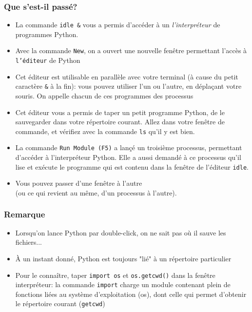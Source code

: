 \documentclass{beamer}
\newcommand{\mypause}{\pause}
\newcommand{\pyth}{{\sc Python}}
\newcommand{\prog}[1]{\alert{\texttt{#1}}}
\begin{document}
\frame
{
\frametitle{Que s'est-il passé?}
{\footnotesize
\begin{itemize}
\item La commande \prog{idle \&} vous a permis d'accéder à un \alert{{\em l'interpréteur}}
de programmes \pyth{}. \mypause{}
\item Avec la commande \prog{New}, on a ouvert une nouvelle fenêtre permettant
l'accès à \prog{l'éditeur} de \pyth{}\mypause{}
\item Cet éditeur est utilisable \alert{en parallèle} avec votre terminal (à cause du petit caractère
\prog{\&} à la fin): vous pouvez utiliser l'un ou l'autre, en déplaçant votre souris. On appelle chacun
de ces programmes des \alert{processus}\mypause{}
\item Cet éditeur vous a permis de taper un petit programme \pyth{}, de le sauvegarder
dans votre répertoire courant. Allez dans votre fenêtre de commande, et vérifiez
avec la commande \prog{ls} qu'il y est bien.\mypause{}
\item La commande \prog{Run Module (F5)} a lançé un troisième processus, permettant
d'accéder à l'interpréteur \pyth{}. Elle a aussi demandé à ce processus qu'il lise et exécute
le programme qui est contenu dans la fenêtre de l'éditeur \prog{idle}. \mypause{}
\item Vous pouvez passer d'une \alert{fenêtre} à l'autre \\
  (ou ce qui revient au même, d'un \alert{processus} à l'autre).
\end{itemize}
}
}

\frame
{
\frametitle{Remarque}
\begin{itemize}
\item Lorsqu'on lance \pyth{} par double-click, on ne sait pas où il sauve les fichiers...\mypause{}
\mypause{}
\item À un instant donné, \pyth{} est toujours "lié" à un répertoire particulier\mypause{}
\item Pour le connaître, taper \prog{import os} et \prog{os.getcwd()}
dans la fenêtre interpréteur: la commande \prog{import} charge
un module contenant plein de fonctions liées au système d'exploitation (os),
dont celle qui permet d'obtenir le répertoire courant (\prog{getcwd})
\end{itemize}
}
\end{document}
